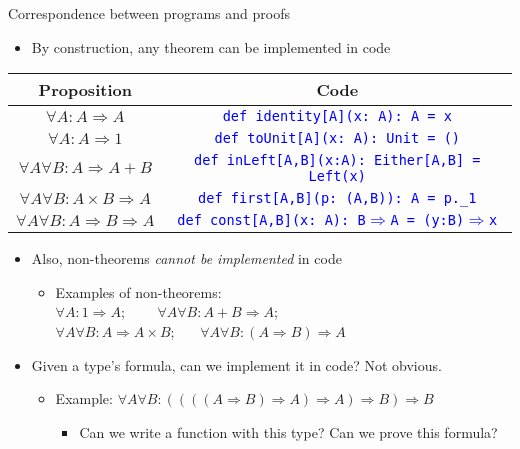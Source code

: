 \documentclass[english]{beamer}
\providecommand{\tabularnewline}{\\}
\begin{document}
\begin{frame}{Correspondence between programs and proofs}

\begin{itemize}
\item By construction, any theorem can be implemented in code
\end{itemize}
\begin{center}
\begin{tabular}{|c|c|}
\hline 
\textbf{Proposition} &
\textbf{Code}\tabularnewline
\hline 
\hline 
$\forall A:A\Rightarrow A$ &
\texttt{\textcolor{blue}{\footnotesize{}def identity{[}A{]}(x:\ A):\ A
= x}}\tabularnewline
\hline 
$\forall A:A\Rightarrow1$ &
\texttt{\textcolor{blue}{\footnotesize{}def toUnit{[}A{]}(x:\ A): Unit
= ()}}\tabularnewline
\hline 
$\forall A\forall B:A\Rightarrow A+B$ &
\texttt{\textcolor{blue}{\footnotesize{}def inLeft{[}A,B{]}(x:A):\ Either{[}A,B{]}
= Left(x)}}\tabularnewline
\hline 
$\forall A\forall B:A\times B\Rightarrow A$ &
\texttt{\textcolor{blue}{\footnotesize{}def first{[}A,B{]}(p:\ (A,B)):\ A
= p.\_1}}\tabularnewline
\hline 
$\forall A\forall B:A\Rightarrow B\Rightarrow A$ &
\texttt{\textcolor{blue}{\footnotesize{}def const{[}A,B{]}(x:\ A):\ B$\Rightarrow$A
= (y:B)$\Rightarrow$x}}\tabularnewline
\hline 
\end{tabular}
\par\end{center}
\begin{itemize}
\item Also, non-theorems \emph{cannot be implemented} in code 
\begin{itemize}
\item Examples of non-theorems:\\
 $\forall A:1\Rightarrow A$; \  \  $\quad\forall A\forall B:A+B\Rightarrow A$;
\\
$\forall A\forall B:A\Rightarrow A\times B$; \  $\quad\forall A\forall B:(A\Rightarrow B)\Rightarrow A$
\end{itemize}
\item Given a type's formula, can we implement it in code? Not obvious.
\begin{itemize}
\item Example: $\forall A\forall B:((((A\Rightarrow B)\Rightarrow A)\Rightarrow A)\Rightarrow B)\Rightarrow B$
\begin{itemize}
\item Can we write a function with this type? Can we prove this formula?
\end{itemize}
\end{itemize}
\end{itemize}
\end{frame}
\end{document}
